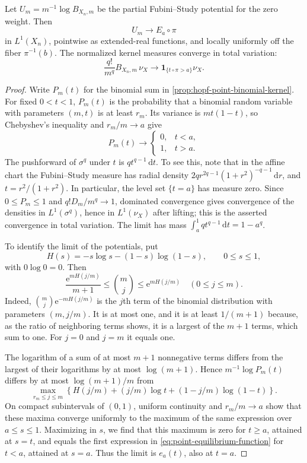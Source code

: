 \begin{theorem}\label{thm:hopf-point-potential-limit}
Let $U_m=m^{-1}\log B_{X_n,m}$ be the partial Fubini--Study potential for the zero weight. Then
\[
 U_m\longrightarrow E_a\circ\pi
\]
in $L^1(X_n)$, pointwise as extended-real functions, and locally uniformly off the fiber $\pi^{-1}(b)$. The normalized kernel measures converge in total variation:
\[
 \frac{q!}{m^q}B_{X_n,m}\,\nu_X
       \longrightarrow
       \mathbf1_{\{t\circ\pi>a\}}\nu_X.
\]
\end{theorem}
\begin{proof}
Write $P_m(t)$ for the binomial sum in \cref{prop:hopf-point-binomial-kernel}. For fixed $0<t<1$, $P_m(t)$ is the probability that a binomial random variable with parameters $(m,t)$ is at least $r_m$. Its variance is $mt(1-t)$, so Chebyshev's inequality and $r_m/m\to a$ give
\[
 P_m(t)\longrightarrow
 \begin{cases}0,&t<a,\\1,&t>a.\end{cases}
\]
The pushforward of $\sigma^q$ under $t$ is $q t^{q-1}\,\mathrm{d}t$. To see this, note that in the affine chart the Fubini--Study measure has radial density
$2q r^{2q-1}(1+r^2)^{-q-1}\,\mathrm{d}r$, and $t=r^2/(1+r^2)$. In particular, the level set $\{t=a\}$ has measure zero. Since $0\leq P_m\leq1$ and $q!D_m/m^q\to1$, dominated convergence gives convergence of the densities in $L^1(\sigma^q)$, hence in $L^1(\nu_X)$ after lifting; this is the asserted convergence in total variation. The limit has mass $\int_a^1 qt^{q-1}\,\mathrm{d}t=1-a^q$.

To identify the limit of the potentials, put
\[
 H(s)=-s\log s-(1-s)\log(1-s),\qquad 0\leq s\leq1,
\]
with $0\log0=0$. Then
\[
 \frac{\mathrm{e}^{mH(j/m)}}{m+1}\leq\binom mj
                   \leq \mathrm{e}^{mH(j/m)}\quad(0\leq j\leq m).
\]
Indeed, $\binom mj\mathrm{e}^{-mH(j/m)}$ is the $j$th term of the binomial distribution with parameters $(m,j/m)$. It is at most one, and it is at least $1/(m+1)$ because, as the ratio of neighboring terms shows, it is a largest of the $m+1$ terms, which sum to one. For $j=0$ and $j=m$ it equals one.

The logarithm of a sum of at most $m+1$ nonnegative terms differs from the largest of their logarithms by at most $\log(m+1)$. Hence $m^{-1}\log P_m(t)$ differs by at most $\log(m+1)/m$ from
\[
 \max_{r_m\leq j\leq m}
 \left\{H(j/m)+(j/m)\log t+(1-j/m)\log(1-t)\right\}.
\]
On compact subintervals of $(0,1)$, uniform continuity and $r_m/m\to a$ show that these maxima converge uniformly to the maximum of the same expression over $a\leq s\leq1$. Maximizing in $s$, we find that this maximum is zero for $t\geq a$, attained at $s=t$, and equals the first expression in \eqref{eq:point-equilibrium-function} for $t<a$, attained at $s=a$. Thus the limit is $e_a(t)$, also at $t=a$.


\end{proof}
